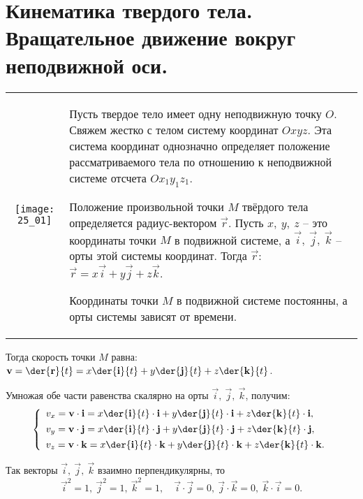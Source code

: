 \chapter{Кинематика твердого тела. Вращательное движение вокруг неподвижной
оси.}

\begin{table}[h!]
    \vspace*{-2em}
    \begin{tabular}{C{.4}m{.55\textwidth}}
        \texttt{[image: 25\_01]} &
        Пусть твердое тело имеет одну неподвижную точку \( O \). Свяжем жестко
        с телом систему координат \( Oxyz \). Эта система координат однозначно
        определяет положение рассматриваемого тела по отношению к неподвижной
        системе отсчета \( Ox_1y_1z_1 \).

        Положение произвольной точки \( M \) твёрдого тела определяется
        радиус-вектором \( \vec{r} \). Пусть \( x,\ y,\ z \) -- это координаты
        точки \( M \) в подвижной системе, а \( \vec{i},\ \vec{j},\ \vec{k} \)
        -- орты этой системы координат. Тогда \( \vec{r} \):
        \( \vec{r} = x\vec{i} + y\vec{j} + z\vec{k} \).

        Координаты точки \( M \) в подвижной системе постоянны, а орты системы
        зависят от времени.
    \end{tabular}
    \vspace*{-1.5em}
\end{table}

Тогда скорость точки \( M \) равна: \( \ds \vec{v} = \der{\vec{r}}{t} =
x\der{\vec{i}}{t} + y\der{\vec{j}}{t} + z\der{\vec{k}}{t} \).

Умножая обе части равенства скалярно на орты \( \vec{i},\ \vec{j},\ \vec{k} \),
получим:
\[
    \left\{ \begin{array}{l}
        \ds v_x = \vec{v}\cdot\vec{i} = x\der{\vec{i}}{t}\cdot\vec{i} +
        y\der{\vec{j}}{t}\cdot\vec{i} + z\der{\vec{k}}{t}\cdot\vec{i}, \\[.4em]
        \ds v_y = \vec{v}\cdot\vec{j} = x\der{\vec{i}}{t}\cdot\vec{j} +
        y\der{\vec{j}}{t}\cdot\vec{j} + z\der{\vec{k}}{t}\cdot\vec{j}, \\[.4em]
        \ds v_z = \vec{v}\cdot\vec{k} = x\der{\vec{i}}{t}\cdot\vec{k} +
        y\der{\vec{j}}{t}\cdot\vec{k} + z\der{\vec{k}}{t}\cdot\vec{k}.
    \end{array} \right.
\]

Так векторы \( \vec{i},\ \vec{j},\ \vec{k} \) взаимно перпендикулярны, то
\[
    \vec{i}^2 = 1,\ \vec{j}^2 = 1,\ \vec{k}^2 = 1, \quad
    \vec{i}\cdot\vec{j} = 0,\ \vec{j}\cdot\vec{k} = 0,\ \vec{k}\cdot\vec{i} = 0.
\]

